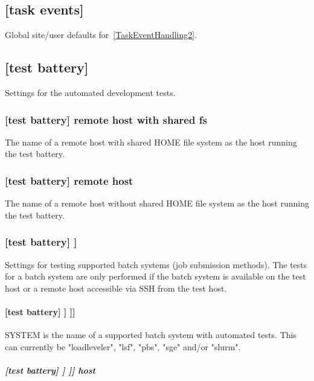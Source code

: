 \subsection{[task events]}

Global site/user defaults for~\ref{TaskEventHandling2}.

\subsection{[test battery]}

Settings for the automated development tests.

\subsubsection[remote host with shared fs]{[test battery] \textrightarrow remote host with shared fs}

The name of a remote host with shared HOME file system as the host running the
test battery.

\subsubsection[remote host with shared fs]{[test battery] \textrightarrow remote host}

The name of a remote host without shared HOME file system as the host running
the test battery.

\subsubsection[{[[}batch systems{]]}]{[test battery] \textrightarrow [[batch systems]]}

Settings for testing supported batch systems (job submission methods). The
tests for a batch system are only performed if the batch system is available on
the test host or a remote host accessible via SSH from the test host.

\paragraph[{[[[}SYSTEM{]]]}]{[test battery] \textrightarrow [[batch systems]] \textrightarrow [[[SYSTEM]]]}

SYSTEM is the name of a supported batch system with automated tests.
This can currently be "loadleveler", "lsf", "pbs", "sge" and/or "slurm".

\subparagraph[host]{[test battery] \textrightarrow [[batch systems]] \textrightarrow [[[SYSTEM]]] \textrightarrow host}

